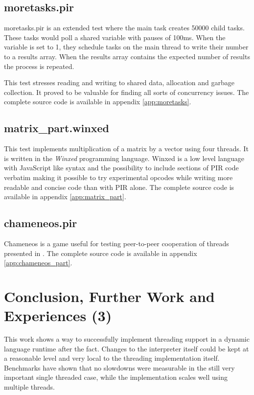 \documentclass[bachelor,english]{hgbthesis}
\begin{document}
\section{moretasks.pir}

moretasks.pir is an extended test where the main task creates 50000 child tasks. These tasks would poll a shared variable with pauses of 100ms. When the variable is set to 1, they schedule tasks on the main thread to write their number to a results array. When the results array contains the expected number of results the process is repeated.

This test stresses reading and writing to shared data, allocation and garbage collection. It proved to be valuable for finding all sorts of concurrency issues. The complete source code is available in appendix \ref{app:moretasks}.

\section{matrix\_part.winxed}

This test implements multiplication of a matrix by a vector using four threads. It is written in the \textit{Winxed} programming language. Winxed is a low level language with JavaScript like syntax and the possibility to include sections of PIR code verbatim making it possible to try experimental opcodes while writing more readable and concise code than with PIR alone. The complete source code is available in appendix \ref{app:matrix_part}.

\section{chameneos.pir}

Chameneos is a game useful for testing peer-to-peer cooperation of threads presented in \cite{Chameneos}. The complete source code is available in appendix \ref{app:chameneos_part}.

\chapter{Conclusion, Further Work and Experiences (3)}

This work shows a way to successfully implement threading support in a dynamic language runtime after the fact. Changes to the interpreter itself could be kept at a reasonable level and very local to the threading implementation itself. Benchmarks have shown that no slowdowns were measurable in the still very important single threaded case, while the implementation scales well using multiple threads.
\end{document}
